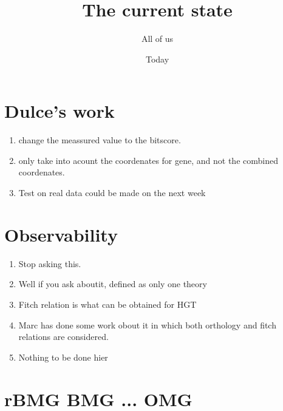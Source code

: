 \documentclass[11pt]{article}
\begin{document}
\title{The current state}
\author{All of us}
\date{Today}
\maketitle

\section{Dulce's work}

\begin{enumerate}
\item change the meassured value to the bitscore.
\item only take into acount the coordenates for gene, and not the combined coordenates.
\item Test on real data could be made on the next week
\end{enumerate}

\section{Observability}

\begin{enumerate}
\item Stop asking this.
\item Well if you ask aboutit, defined as only one theory
\item Fitch relation is what can be obtained for HGT
\item Marc has done some work obout it in which both orthology and fitch relations are considered.
\item Nothing to be done hier
\end{enumerate}


\section{rBMG BMG ... OMG}
\end{document}
